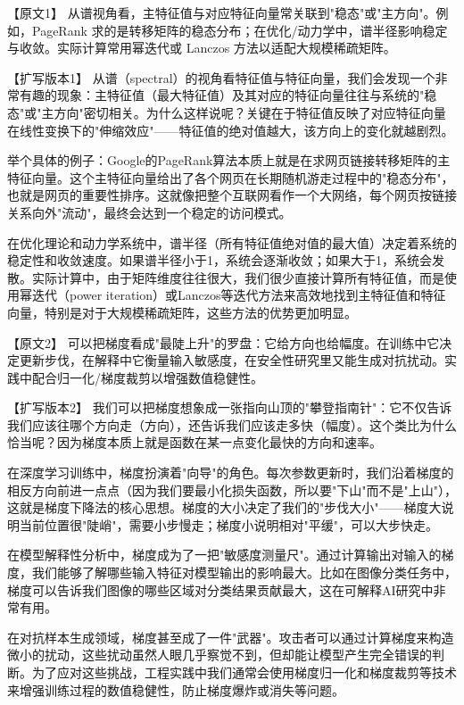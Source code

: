 【原文1】
从谱视角看，主特征值与对应特征向量常关联到"稳态"或"主方向"。例如，PageRank 求的是转移矩阵的稳态分布；在优化/动力学中，谱半径影响稳定与收敛。实际计算常用幂迭代或 Lanczos 方法以适配大规模稀疏矩阵。

【扩写版本1】
从谱（spectral）的视角看特征值与特征向量，我们会发现一个非常有趣的现象：主特征值（最大特征值）及其对应的特征向量往往与系统的"稳态"或"主方向"密切相关。为什么这样说呢？关键在于特征值反映了对应特征向量在线性变换下的"伸缩效应"——特征值的绝对值越大，该方向上的变化就越剧烈。

举个具体的例子：Google的PageRank算法本质上就是在求网页链接转移矩阵的主特征向量。这个主特征向量给出了各个网页在长期随机游走过程中的"稳态分布"，也就是网页的重要性排序。这就像把整个互联网看作一个大网络，每个网页按链接关系向外"流动"，最终会达到一个稳定的访问模式。

在优化理论和动力学系统中，谱半径（所有特征值绝对值的最大值）决定着系统的稳定性和收敛速度。如果谱半径小于1，系统会逐渐收敛；如果大于1，系统会发散。实际计算中，由于矩阵维度往往很大，我们很少直接计算所有特征值，而是使用幂迭代（power iteration）或Lanczos等迭代方法来高效地找到主特征值和特征向量，特别是对于大规模稀疏矩阵，这些方法的优势更加明显。

【原文2】
可以把梯度看成"最陡上升"的罗盘：它给方向也给幅度。在训练中它决定更新步伐，在解释中它衡量输入敏感度，在安全性研究里又能生成对抗扰动。实践中配合归一化/梯度裁剪以增强数值稳健性。

【扩写版本2】
我们可以把梯度想象成一张指向山顶的"攀登指南针"：它不仅告诉我们应该往哪个方向走（方向），还告诉我们应该走多快（幅度）。这个类比为什么恰当呢？因为梯度本质上就是函数在某一点变化最快的方向和速率。

在深度学习训练中，梯度扮演着"向导"的角色。每次参数更新时，我们沿着梯度的相反方向前进一点点（因为我们要最小化损失函数，所以要"下山"而不是"上山"），这就是梯度下降法的核心思想。梯度的大小决定了我们的"步伐大小"——梯度大说明当前位置很"陡峭"，需要小步慢走；梯度小说明相对"平缓"，可以大步快走。

在模型解释性分析中，梯度成为了一把"敏感度测量尺"。通过计算输出对输入的梯度，我们能够了解哪些输入特征对模型输出的影响最大。比如在图像分类任务中，梯度可以告诉我们图像的哪些区域对分类结果贡献最大，这在可解释AI研究中非常有用。

在对抗样本生成领域，梯度甚至成了一件"武器"。攻击者可以通过计算梯度来构造微小的扰动，这些扰动虽然人眼几乎察觉不到，但却能让模型产生完全错误的判断。为了应对这些挑战，工程实践中我们通常会使用梯度归一化和梯度裁剪等技术来增强训练过程的数值稳健性，防止梯度爆炸或消失等问题。

